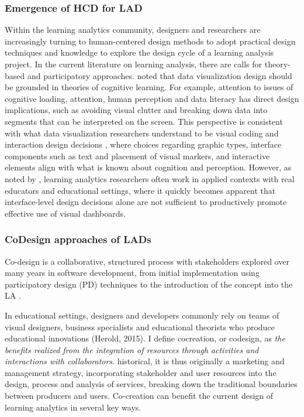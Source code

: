 \documentclass[preprint,12pt]{elsarticle}
\begin{document}
\subsubsection{Emergence of HCD for LAD}
Within the learning analytics community, designers and researchers are increasingly turning to human-centered design methods to adopt practical design techniques and knowledge to explore the design cycle of a learning analysis project. In the current literature on learning analysis, there are calls for theory-based and participatory approaches. \citet{alhadad2018visualizing}  noted that data visualization design should be grounded in theories of cognitive learning. For example, attention to issues of cognitive loading, attention, human perception and data literacy has direct design implications, such as avoiding visual clutter and breaking down data into segments that can be interpreted on the screen. This perspective is consistent with what data visualization researchers understand to be visual coding and interaction design decisions \citep{munzner2014visualization}, where choices regarding graphic types, interface components such as text and placement of visual markers, and interactive elements align with what is known about cognition and perception.
However, as noted by \citet{dollinger2018co}, learning analytics researchers often work in applied contexts with real educators and educational settings, where it quickly becomes apparent that interface-level design decisions alone are not sufficient to productively promote effective use of visual dashboards. 


\subsubsection{CoDesign approaches of LADs}
Co-design is a collaborative, structured process with stakeholders explored over many years in software development, from initial implementation using participatory design (PD) techniques to the introduction of the concept into the LA \cite{prieto2020engaging}.

In educational settings, designers and developers commonly rely on teams of visual designers, business specialists and educational theorists who produce educational innovations (Herold, 2015). I
\citet*{mccoll2012health} define cocreation, or codesign, as \textit{the benefits realized from the integration of resources through activities and interactions with collaborators}. historical, it is thus originally a marketing and management strategy, incorporating stakeholder and user resources into the design, process and analysis of services, breaking down the traditional boundaries between producers and users. Co-creation can benefit the current design of learning
analytics in several key ways.
\end{document}
